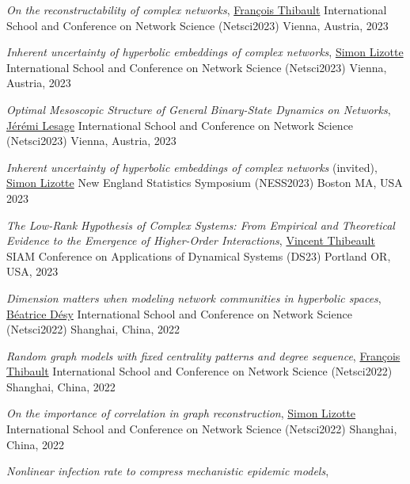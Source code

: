 \documentclass[11pt]{article}
\makeatletter
\newcommand{\reversearabic}[1]{\expandafter\@reversearabic\csname c@#1\endcsname}
\newcommand{\@reversearabic}[1]{%
  \number\numexpr\getrefnumber{this@etaremune@\romannumeral\c@etaremune}-#1+1\relax
}
\newcounter{etaremune}
\newenvironment{etaremune}[1][]{%
  \stepcounter{etaremune}%
  \begin{enumerate}[label=\reversearabic*.,#1]%
}{%
  \edef\@currentlabel{\the\csname c@\@enumctr\endcsname}%
  \label{this@etaremune@\romannumeral\c@etaremune}%
  \end{enumerate}%
}
\makeatother
\begin{document}
\begin{etaremune}[itemsep=0.5em, label={[M\reversearabic*]}, first*=\small\vspace{0.5\baselineskip}]
%
  \item \parbox[t]{\textwidth-30pt}{\textit{On the reconstructability of complex networks},
  \uline{François Thibault}\split
  International School and Conference on Network Science (Netsci2023)\split
  Vienna, Austria, 2023}
%
  \item \parbox[t]{\textwidth-30pt}{\textit{Inherent uncertainty of hyperbolic embeddings of complex networks},
  \uline{Simon Lizotte}\split
  International School and Conference on Network Science (Netsci2023)\split
  Vienna, Austria, 2023}
%
  \item \parbox[t]{\textwidth-30pt}{\textit{Optimal Mesoscopic Structure of General Binary-State Dynamics on Networks},
  \uline{Jérémi Lesage}\split
  International School and Conference on Network Science (Netsci2023)\split
  Vienna, Austria, 2023}
%
  \item \parbox[t]{\textwidth-30pt}{\textit{Inherent uncertainty of hyperbolic embeddings of complex networks} (invited),
  \uline{Simon Lizotte}\split
  New England Statistics Symposium (NESS2023)\split
  Boston MA, USA 2023}
%
  \item \parbox[t]{\textwidth-30pt}{\textit{The Low-Rank Hypothesis of Complex Systems: From Empirical and Theoretical Evidence to the Emergence of Higher-Order Interactions},
  \uline{Vincent Thibeault}\split
  SIAM Conference on Applications of Dynamical Systems (DS23)\split
  Portland OR, USA, 2023}
%
  \item \parbox[t]{\textwidth-30pt}{\textit{Dimension matters when modeling network communities in hyperbolic spaces},
  \uline{Béatrice Désy}\split
  International School and Conference on Network Science (Netsci2022)\split
  Shanghai, China, 2022}
%
  \item \parbox[t]{\textwidth-30pt}{\textit{Random graph models with fixed centrality patterns and degree sequence},
  \uline{François Thibault}\split
  International School and Conference on Network Science (Netsci2022)\split
  Shanghai, China, 2022}
%
  \item \parbox[t]{\textwidth-30pt}{\textit{On the importance of correlation in graph reconstruction},
  \uline{Simon Lizotte}\split
  International School and Conference on Network Science (Netsci2022)\split
  Shanghai, China, 2022}
%
  \item \parbox[t]{\textwidth-30pt}{\textit{Nonlinear infection rate to compress mechanistic epidemic models},
}
\end{etaremune}
\end{document}
